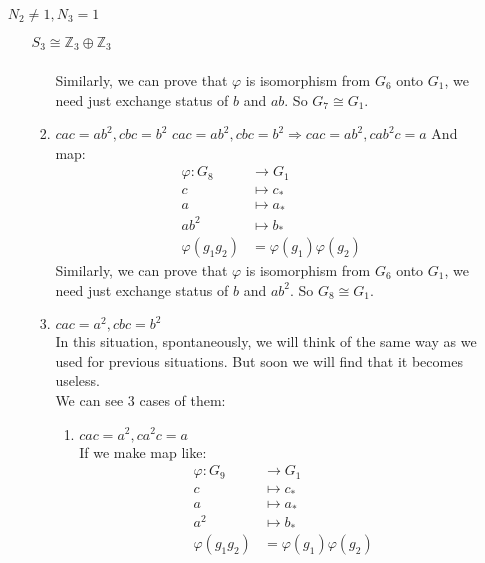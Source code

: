 \documentclass[a4paper,14pt]{article}
\begin{document}
\begin{enumerate}
\begin{item}{$N_2 \neq 1, N_3 = 1$}
\begin{enumerate}
\begin{item}{$S_3\cong \mathbb{Z}_3 \oplus \mathbb{Z}_3$}
\begin{enumerate}
\begin{align*}
                            \end{align*}
                            Similarly, we can prove that $\varphi$ is isomorphism from $G_6$ onto $G_1$, we need just exchange status of $b$ and $ab$.
                            So $G_7 \cong G_1$.
                        \item $cac=ab^2, cbc=b^2$
                            $cac=ab^2, cbc=b^2 \Rightarrow cac = ab^2, cab^2c=a$
                            And map:
                            \begin{align*}
                                \varphi:G_8 &\to G_1\\
                                c &\longmapsto c_*\\
                                a &\longmapsto a_*\\
                                ab^2 &\longmapsto b_*\\
                                \varphi(g_1g_2) &= \varphi(g_1)\varphi(g_2)
                            \end{align*}
                            Similarly, we can prove that $\varphi$ is isomorphism from $G_6$ onto $G_1$, we need just exchange status of $b$ and $ab^2$.
                            So $G_8 \cong G_1$.
                        \item $cac=a^2, cbc=b^2$\\
                            In this situation, spontaneously, we will think of the same way as we used for previous situations. But soon we will find that it
                            becomes useless.\\
                            We can see 3 cases of them:
                            \begin{enumerate}
                                \item $cac = a^2,ca^2c=a$\\
                                    If we make map like:
                                    \begin{align*}
                                        \varphi:G_9 &\to G_1\\
                                        c &\longmapsto c_*\\
                                        a &\longmapsto a_*\\
                                        a^2 &\longmapsto b_*\\
                                        \varphi(g_1g_2) &= \varphi(g_1)\varphi(g_2)

\end{align*}
\end{enumerate}
\end{enumerate}
\end{item}
\end{enumerate}
\end{item}
\end{enumerate}
\end{document}
